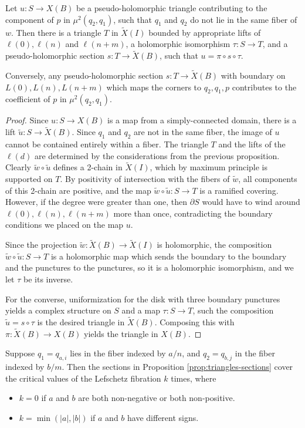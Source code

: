 \documentclass[12pt]{amsart}
\begin{document}
\begin{proposition}
\label{prop:triangles-sections}
Let $u: S \to X(B)$ be a pseudo-holomorphic triangle contributing to
the component of $p$ in $\mu^2(q_2,q_1)$, such that $q_1$ and $q_2$ do not lie in the same fiber of $w$. Then there is a triangle $T$
in $\tilde{X}(I)$ bounded by appropriate lifts of $\ell(0),\ell(n)$
and $\ell(n+m)$, a holomorphic isomorphism $\tau: S\to T$, and a
pseudo-holomorphic section $s :T \to \tilde{X}(B)$, such that
$u = \pi\circ s \circ \tau$.

  Conversely, any pseudo-holomorphic section $s: T \to \tilde{X}(B)$
  with boundary on $L(0),L(n),L(n+m)$ which maps the corners to $q_2,
  q_1, p$ contributes to the coefficient of $p$ in $\mu^2(q_2,q_1)$.
\end{proposition}

\begin{proof}
  Since $u : S \to X(B)$ is a map from a simply-connected domain,
  there is a lift $\tilde{u}: S \to \tilde{X}(B)$. Since $q_1$ and
  $q_2$ are not in the same fiber, the image of $u$ cannot be
  contained entirely within a fiber. The triangle $T$ and the lifts of
  the $\ell(d)$ are determined by the considerations from the previous
  proposition. Clearly $\tilde{w}\circ \tilde{u}$ defines a 2-chain in
  $\tilde{X}(I)$, which by maximum principle is supported on $T$. By
  positivity of intersection with the fibers of $\tilde{w}$, all
  components of this 2-chain are positive, and the map $\tilde{w}\circ
  \tilde{u} : S\to T$ is a ramified covering. However, if the degree
  were greater than one, then $\partial S$ would have to wind around
  $\ell(0),\ell(n),\ell(n+m)$ more than once, contradicting the
  boundary conditions we placed on the map $u$.

  Since the projection $\tilde{w}: \tilde{X}(B) \to \tilde{X}(I)$ is
  holomorphic, the composition $\tilde{w}\circ \tilde{u}: S \to T$ is
  a holomorphic map which sends the boundary to the boundary and the
  punctures to the punctures, so it is a holomorphic isomorphism, and
  we let $\tau$ be its inverse.

  For the converse, uniformization for the disk with three boundary
  punctures yields a complex structure on $S$ and a map $\tau: S \to
  T$, such the composition $\tilde{u} = s \circ \tau$ is the desired
  triangle in $\tilde{X}(B)$. Composing this with $\pi :
  \tilde{X}(B)\to X(B)$ yields the triangle in $X(B)$.
\end{proof}

\begin{proposition}
  \label{prop:k-criticalpoints}
  Suppose $q_1= q_{a,i}$ lies in the fiber indexed by $a/n$, and $q_2
  = q_{b,j}$ in the fiber
  indexed by $b/m$. Then the sections in Proposition
  \ref{prop:triangles-sections} cover the critical values of the
  Lefschetz fibration $k$ times, where
  \begin{itemize}
  \item $k = 0$ if $a$ and $b$ are both non-negative or both non-positive.
  \item $k = \min(|a|,|b|)$ if $a$ and $b$ have different signs.
  \end{itemize}
\end{proposition}
\end{document}
